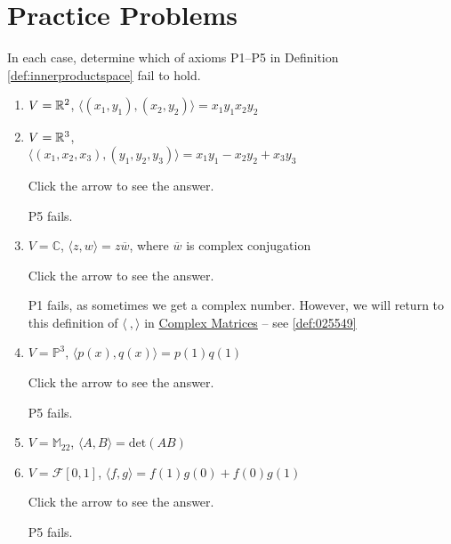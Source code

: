 \documentclass{ximera}
\begin{document}
\section*{Practice Problems}

\begin{problem}\label{prob:inner_prod_1}
In each case, determine which of axioms P1--P5 in Definition \ref{def:innerproductspace} fail to hold.

\begin{enumerate} 
\item $V = \mathbb{R}^2$, $\langle (x_1, y_1), (x_2, y_2) \rangle = x_1y_1x_2y_2$

\item $V = \mathbb{R}^3$, \\$\langle (x_1, x_2, x_3), (y_1, y_2, y_3) \rangle = x_1y_1 - x_2y_2 + x_3y_3$

Click the arrow to see the answer.
\begin{expandable}
P5 fails.
\end{expandable}

\item $V = \mathbb{C}$, $\langle z, w \rangle = z\overline{w}$, where $\overline{w}$ is complex
conjugation

Click the arrow to see the answer.
\begin{expandable}
P1 fails, as sometimes we get a complex number.  However, we will return to this definition of $\langle\ , \rangle$ in \href{https://ximera.osu.edu/oerlinalg/LinearAlgebra/RTH-0050/main}{Complex Matrices} -- see \ref{def:025549}
\end{expandable}

\item $V = \mathbb{P}^3$, $\langle p(x), q(x) \rangle = p(1)q(1)$

Click the arrow to see the answer.
\begin{expandable}
P5 fails.
\end{expandable}

\item $V = \mathbb{M}_{22}$, $\langle A, B \rangle = \mbox{det}(AB)$

\item $V = \mathcal{F}[0, 1]$, $\langle f, g \rangle = f(1)g(0) + f(0)g(1)$

Click the arrow to see the answer.
\begin{expandable}
P5 fails.
\end{expandable}

\end{enumerate}
\end{problem}
\end{document}
